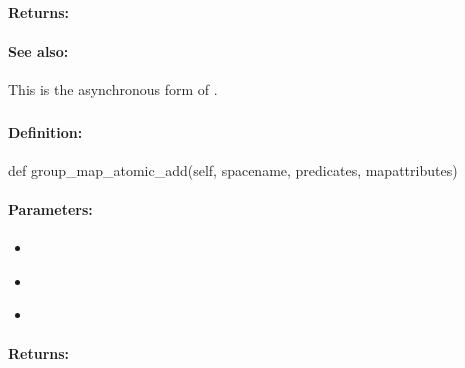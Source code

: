 \paragraph{Returns:}


\paragraph{See also:}  This is the asynchronous form of .

\pagebreak
\subsubsection{}
\label{api:python:group_map_atomic_add}


\paragraph{Definition:}
\begin{pythoncode}
def group_map_atomic_add(self, spacename, predicates, mapattributes)
\end{pythoncode}

\paragraph{Parameters:}
\begin{itemize}[noitemsep]
\item {}\\

\item {}\\

\item {}\\

\end{itemize}

\paragraph{Returns:}



